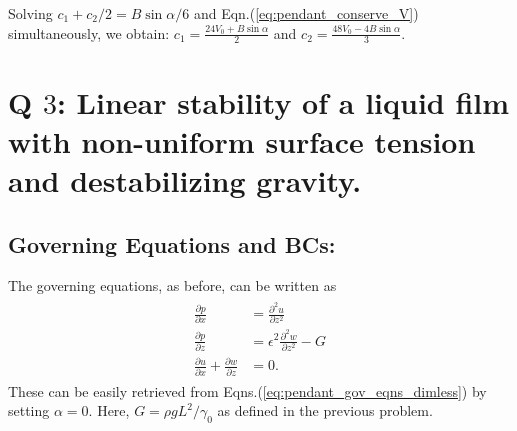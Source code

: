 \documentclass{article}
\begin{document}
Solving 
$c_{1} + c_{2}/2 = B\sin{\alpha}/6$ and Eqn.(\ref{eq:pendant_conserve_V}) simultaneously, we obtain: $c_{1} =  \frac{24V_{0} + B\sin{\alpha}}{2}$ and $c_{2} = \frac{48 V_{0} - 4B\sin{\alpha}}{3}$.  

\section{Q $3$: Linear stability of a liquid film with non-uniform surface tension and destabilizing gravity. }
\subsection*{Governing Equations and BCs:}
The governing equations, as before, can be written as 
\begin{align}\label{eq:marangoni_gov_eqns_dimless}
 \begin{split}
 \frac{\partial p}{\partial x} &= \frac{\partial^{2} u}{\partial z^{2}}  \\
  \frac{\partial p}{\partial z} &= \epsilon^{2} \frac{\partial^{2} w}{\partial z^{2}} - G  \\
  \frac{\partial u}{\partial x} + \frac{\partial w}{\partial z} &= 0.
 \end{split}
\end{align}
These can be easily retrieved from Eqns.(\ref{eq:pendant_gov_eqns_dimless}) by setting $\alpha = 0$. Here, $G = \rho g L^{2}/\gamma_{0}$ as defined in the previous problem. 
\end{document}
